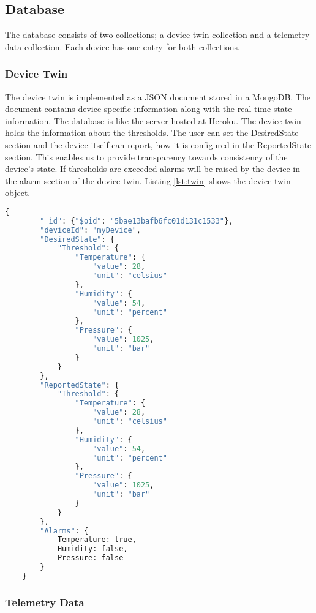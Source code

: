 \subsection{Database}
The database consists of two collections; a device twin collection and a telemetry data collection. Each device has one entry for both collections.
\subsubsection*{Device Twin}
The device twin is implemented as a JSON document stored in a MongoDB. The document contains device specific information along with the real-time state information. The database is like the server hosted at Heroku. The device twin holds the information about the thresholds. The user can set the DesiredState section and the device itself can report, how it is configured in the ReportedState section. This enables us to provide transparency towards consistency of the device's state. If thresholds are exceeded alarms will be raised by the device in the alarm section of the device twin. Listing \ref{lst:twin} shows the device twin object.
\begin{lstlisting}[language=Python, caption=Device Twin, label={lst:twin}, basicstyle=\scriptsize]
    {
        "_id": {"$oid": "5bae13bafb6fc01d131c1533"}, 
        "deviceId": "myDevice", 
        "DesiredState": {
            "Threshold": {
                "Temperature": {
                    "value": 28, 
                    "unit": "celsius"
                }, 
                "Humidity": {
                    "value": 54, 
                    "unit": "percent"
                }, 
                "Pressure": {
                    "value": 1025, 
                    "unit": "bar"
                }
            }
        }, 
        "ReportedState": {
            "Threshold": {
                "Temperature": {
                    "value": 28, 
                    "unit": "celsius"
                }, 
                "Humidity": {
                    "value": 54, 
                    "unit": "percent"
                }, 
                "Pressure": {
                    "value": 1025, 
                    "unit": "bar"
                }
            }
        }, 
        "Alarms": {
            Temperature: true,
            Humidity: false,
            Pressure: false
        }
    } 
\end{lstlisting}

\subsubsection*{Telemetry Data}

